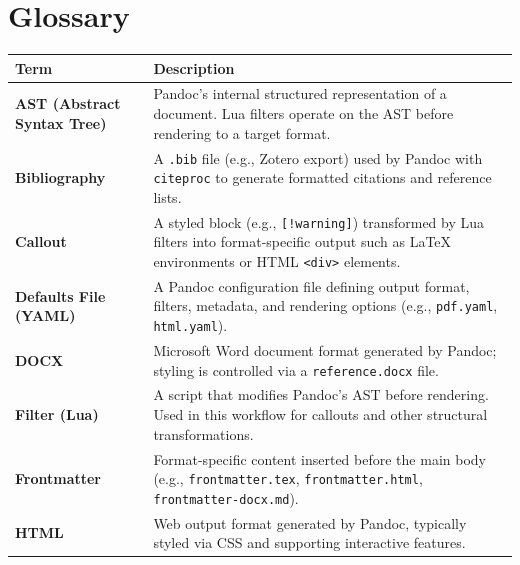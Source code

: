 \documentclass[
  12pt,
  openany]{book}
\newcounter{none} %
\begin{document}
\backmatter

\chapter*{Glossary}\label{glossary-1}

{\def\LTcaptype{none} %
\begin{longtable}[]{@{}
  >{\raggedright\arraybackslash}p{}
  >{\raggedright\arraybackslash}p{}@{}}
\toprule\noalign{}
\begin{minipage}[b]{\linewidth}\raggedright
Term
\end{minipage} & \begin{minipage}[b]{\linewidth}\raggedright
Description
\end{minipage} \\
\midrule\noalign{}
\endhead
\bottomrule\noalign{}
\endlastfoot
\textbf{AST (Abstract Syntax Tree)} & Pandoc's internal structured
representation of a document. Lua filters operate on the AST before
rendering to a target format. \\
\textbf{Bibliography} & A \texttt{.bib} file (e.g., Zotero export) used
by Pandoc with \texttt{citeproc} to generate formatted citations and
reference lists. \\
\textbf{Callout} & A styled block (e.g., \texttt{{[}!warning{]}})
transformed by Lua filters into format-specific output such as LaTeX
environments or HTML \texttt{\textless{}div\textgreater{}} elements. \\
\textbf{Defaults File (YAML)} & A Pandoc configuration file defining
output format, filters, metadata, and rendering options (e.g.,
\texttt{pdf.yaml}, \texttt{html.yaml}). \\
\textbf{DOCX} & Microsoft Word document format generated by Pandoc;
styling is controlled via a \texttt{reference.docx} file. \\
\textbf{Filter (Lua)} & A script that modifies Pandoc's AST before
rendering. Used in this workflow for callouts and other structural
transformations. \\
\textbf{Frontmatter} & Format-specific content inserted before the main
body (e.g., \texttt{frontmatter.tex}, \texttt{frontmatter.html},
\texttt{frontmatter-docx.md}). \\
\textbf{HTML} & Web output format generated by Pandoc, typically styled
via CSS and supporting interactive features. \\

\end{longtable}}
\end{document}
